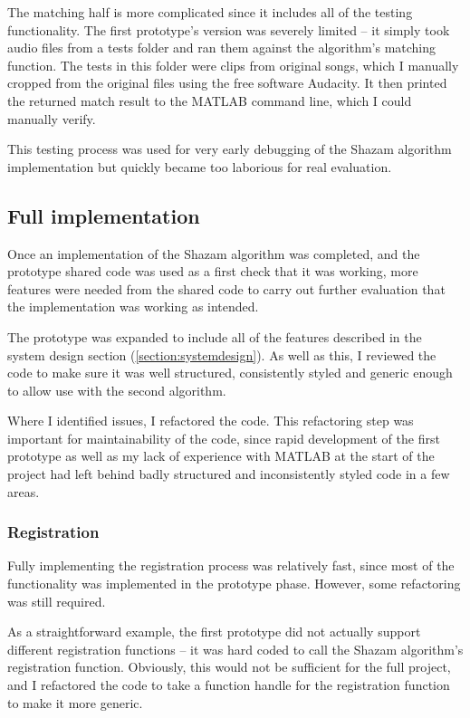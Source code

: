 \documentclass[12pt,a4paper,twoside,openright]{report}
\begin{document}
The matching half is more complicated since it includes all of the testing functionality. The first prototype's version was severely limited -- it simply took audio files from a tests folder and ran them against the algorithm's matching function. The tests in this folder were clips from original songs, which I manually cropped from the original files using the free software Audacity. It then printed the returned match result to the MATLAB command line, which I could manually verify.

This testing process was used for very early debugging of the Shazam algorithm implementation but quickly became too laborious for real evaluation.


\subsection{Full implementation}

Once an implementation of the Shazam algorithm was completed, and the prototype shared code was used as a first check that it was working, more features were needed from the shared code to carry out further evaluation that the implementation was working as intended.

The prototype was expanded to include all of the features described in the system design section (\ref{section:systemdesign}). As well as this, I reviewed the code to make sure it was well structured, consistently styled and generic enough to allow use with the second algorithm. 

Where I identified issues, I refactored the code. This refactoring step was important for maintainability of the code, since rapid development of the first prototype as well as my lack of experience with MATLAB at the start of the project had left behind badly structured and inconsistently styled code in a few areas.


\subsubsection{Registration}

Fully implementing the registration process was relatively fast, since most of the functionality was implemented in the prototype phase. However, some refactoring was still required.

As a straightforward example, the first prototype did not actually support different registration functions -- it was hard coded to call the Shazam algorithm's registration function. Obviously, this would not be sufficient for the full project, and I refactored the code to take a function handle for the registration function to make it more generic.
\end{document}
